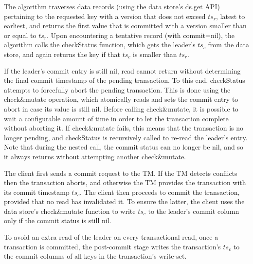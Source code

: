 The algorithm traverses data  records (using the data store's ds.get API) pertaining
to the requested key with a version that does not exceed $ts_r$, latest to earliest, and returns the first value that is committed
with a  version smaller than or equal to $ts_r$. Upon
encountering a tentative record (with commit=nil), the algorithm calls the {\sc checkStatus} function, which
gets the leader's $ts_c$ from the data store, and again returns the key if that $ts_c$ is smaller than $ts_r$. 

If the leader's commit entry is still nil, read cannot return without determining the final commit timestamp
of the pending transaction. 
To this end, {\sc checkStatus} attempts to forcefully abort the pending transaction. This is done using the
 {check\&mutate} operation, which atomically reads and sets the commit entry to abort in case its value is still nil. 
Before calling {check\&mutate}, it is possible to wait a configurable amount of time in order to let the transaction complete without aborting it.
If check\&mutate fails, this means that the transaction is no longer pending, and {\sc checkStatus} is recursively called to
re-read the leader's entry. Note that during the nested call, the commit status can no longer be nil, and so it
always returns without attempting another check\&mutate.
 


The client first 
sends a commit request to the TM. 
If the TM detects conflicts then the transaction aborts, and otherwise the TM provides the transaction with its commit  timestamp $ts_c$. 
The client then proceeds to commit the transaction, provided that no read has invalidated it. To ensure the latter, the client uses 
the data store's check\&mutate function to write $ts_c$ to the leader's commit column 
only if the commit status is still nil.

To avoid an extra read of the leader on every transactional read, once a transaction is committed, the post-commit stage writes 
the transaction's $ts_c$ to the commit columns of all keys in  the transaction's write-set. 

